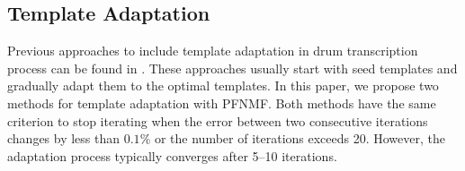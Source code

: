 \documentclass{article}
\begin{document}
\subsection{Template Adaptation}\label{subsec:templateAdapt}
Previous approaches to include template adaptation in drum transcription process can be found in \cite{yoshii_drum_2007,Dittmar2014}. These approaches usually start with seed templates and gradually adapt them to the optimal templates. In this paper, we propose two methods for template adaptation with PFNMF. 
Both methods have the same criterion to stop iterating when the error between two consecutive iterations changes by less than $0.1\%$ or the number of iterations exceeds 20. However, the adaptation process typically converges after 5--10 iterations. 
\end{document}
